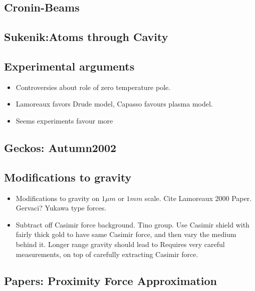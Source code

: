 \cite{Folman2000,Schneider2003}

\subsection{Cronin-Beams}

\cite{Perreault2005,Lonij2009}

\subsection{Sukenik:Atoms through Cavity}

\cite{Sukenik1993}

\subsection{Experimental arguments}

\begin{itemize}
\item Controversies about role of zero temperature pole.  
\item Lamoreaux favors Drude model, Capasso favours plasma model.
\item Seems experiments favour more 
\end{itemize}

\subsection{Geckos: Autumn2002}
\cite{Autumn2002}

\cite{Hawkes2014}

\subsection{Modifications to gravity}

\begin{itemize}
\item Modifications to gravity on $1\mu m$ or $1mm$ scale.  Cite Lamoreaux 2000 Paper.  Gervaci?
Yukawa type forces.  
\item Subtract off Casimir force background.  Tino group.  Use Casimir shield with fairly thick gold to have same Casimir force, and then vary the medium behind it.  Longer range gravity should lead to Requires very careful measurements, on top of carefully extracting Casimir force.   
\end{itemize}

\subsection{Papers: Proximity Force Approximation}

